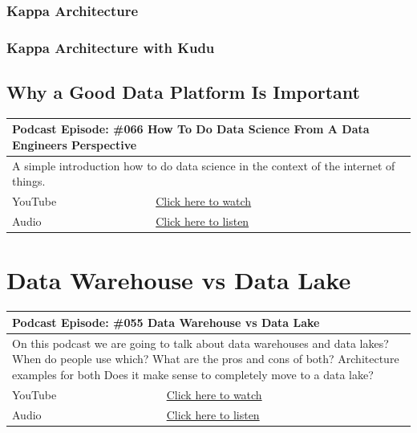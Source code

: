 \documentclass[12pt, numbers=noenddot]{scrreprt} %
\begin{document}
\subsection{Kappa Architecture}
\subsection{Kappa Architecture with Kudu}

\section{Why a Good Data Platform Is Important}

\begin{table}[h]
\begin{tabular}{ll}
\hline
\multicolumn{2}{l}{\textbf{Podcast Episode:} \#066 How To Do Data Science From A Data Engineers Perspective} \\ \hline
\multicolumn{2}{p{15cm}}{A simple introduction how to do data science in the context of the internet of things.}         \\ \hline
\multicolumn{1}{l|}{YouTube}   & \href{https://youtu.be/yp_cc4R0mGQ}{Click here to watch}   \\ 
\multicolumn{1}{l|}{Audio}     & \href{https://anchor.fm/andreaskayy/episodes/066-How-To-Do-Data-Science-From-A-Data-Engineers-Perspective-e45imt}{Click here to listen}   \\ \hline
\end{tabular}
\end{table}



\chapter{Data Warehouse vs Data Lake}

\begin{table}[h]
\begin{tabular}{ll}
\hline
\multicolumn{2}{l}{\textbf{Podcast Episode:} \#055 Data Warehouse vs Data Lake} \\ \hline
\multicolumn{2}{p{15cm}}{On this podcast we are going to talk about data warehouses and data lakes? 
When do people use which?
What are the pros and cons of both?
Architecture examples for both
Does it make sense to completely move to a data lake?}         \\ \hline
\multicolumn{1}{l|}{YouTube}   & \href{https://youtu.be/8gNQTrUUwMk}{Click here to watch}   \\ 
\multicolumn{1}{l|}{Audio}     & \href{https://anchor.fm/andreaskayy/episodes/055-Data-Warehouse-vs-Data-Lake-e45iem}{Click here to listen}   \\ \hline
\end{tabular}
\end{table}
\end{document}
